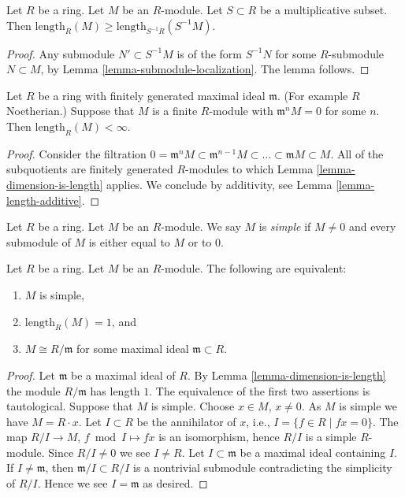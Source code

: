 \begin{lemma}
\label{lemma-length-localize}
Let $R$ be a ring. Let $M$ be an $R$-module. Let $S \subset R$ be
a multiplicative subset. Then
$\text{length}_R(M) \geq \text{length}_{S^{-1}R}(S^{-1}M)$.
\end{lemma}

\begin{proof}
Any submodule $N' \subset S^{-1}M$ is of the form
$S^{-1}N$ for some $R$-submodule $N \subset M$, by Lemma
\ref{lemma-submodule-localization}. The lemma follows.
\end{proof}

\begin{lemma}
\label{lemma-length-finite}
Let $R$ be a ring with finitely generated
maximal ideal $\mathfrak m$. (For example $R$ Noetherian.)
Suppose that $M$ is a finite $R$-module with
$\mathfrak m^n M  =  0$ for some $n$.
Then $\text{length}_R(M) < \infty$.
\end{lemma}

\begin{proof}
Consider the filtration
$0 = \mathfrak m^n M \subset
\mathfrak m^{n-1} M \subset
\ldots \subset \mathfrak m M \subset M$.
All of the subquotients are finitely generated $R$-modules
to which Lemma \ref{lemma-dimension-is-length} applies. We conclude
by additivity, see Lemma \ref{lemma-length-additive}.
\end{proof}

\begin{definition}
\label{definition-simple-module}
Let $R$ be a ring. Let $M$ be an $R$-module.
We say $M$ is {\it simple} if $M \not = 0$ and
every submodule of $M$ is either equal to $M$ or
to $0$.
\end{definition}

\begin{lemma}
\label{lemma-characterize-length-1}
Let $R$ be a ring. Let $M$ be an $R$-module.
The following are equivalent:
\begin{enumerate}
\item $M$ is simple,
\item $\text{length}_R(M) = 1$, and
\item $M \cong R/\mathfrak m$ for some maximal ideal
$\mathfrak m \subset R$.
\end{enumerate}
\end{lemma}

\begin{proof}
Let $\mathfrak m$ be a maximal ideal of $R$.
By Lemma \ref{lemma-dimension-is-length} the module
$R/\mathfrak m$ has length $1$. The equivalence of
the first two assertions is tautological.
Suppose that $M$ is simple. Choose $x \in M$, $x \not = 0$.
As $M$ is simple we have $M = R \cdot x$.
Let $I \subset R$ be the annihilator of $x$, i.e.,
$I = \{f \in R \mid fx = 0\}$. The map $R/I \to M$,
$f \bmod I \mapsto fx$ is an isomorphism, hence
$R/I$ is a simple $R$-module. Since $R/I \not = 0$ we see $I \not = R$.
Let $I \subset \mathfrak m$ be a maximal ideal containing $I$.
If $I \not = \mathfrak m$, then $\mathfrak m /I \subset R/I$
is a nontrivial submodule contradicting the simplicity
of $R/I$. Hence we see $I = \mathfrak m$ as desired.
\end{proof}

